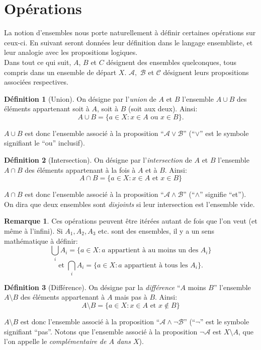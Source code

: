 \documentclass[oneside,12pt,french,table]{book}
\theoremstyle{definition}
\theoremstyle{definition}
\theoremstyle{definition}
\newtheorem{definition}{Définition}[chapter]
\newtheorem*{remark}{Remarque}
\begin{document}
\section{Opérations}
\noindent La notion d'ensembles nous porte naturellement à définir certaines opérations sur ceux-ci. En suivant seront données leur définition dans le langage ensembliste, et leur analogie avec les propositions logiques. \\
Dans tout ce qui suit, $A$, $B$ et $C$ désignent des ensembles quelconques, tous compris dans un ensemble de départ $X$. $\mathcal{A},$ $\mathcal{B}$ et $\mathcal{C}$ désignent leurs propositions associées respectives.
\newpage
\begin{definition}[Union]
On désigne par l'\textit{union} de $A$ et $B$ l'ensemble $A \cup B$ des éléments appartenant soit à $A$, soit à $B$ (soit aux deux). Ainsi:
$$A \cup B = \{ a \in X : x \in A \text{ ou } x \in B \}.$$
\end{definition}
\noindent $A \cup B$ est donc l'ensemble associé à la proposition ``$\mathcal{A} \vee \mathcal{B}$'' (``$\vee$'' est le symbole signifiant le ``ou'' inclusif).
\begin{definition}[Intersection]
On désigne par l'\textit{intersection} de $A$ et $B$ l'ensemble $A \cap B$ des éléments appartenant à la fois à $A$ et à $B$. Ainsi:
$$A \cap B = \{ a \in X : x \in A \text{ et } x \in B \}$$
\end{definition}
\noindent $A \cap B$ est donc l'ensemble associé à la proposition ``$\mathcal{A} \wedge \mathcal{B}$'' (``$\wedge$'' signifie ``et''). \\
On dira que deux ensembles sont \textit{disjoints} si leur intersection est l'ensemble vide.
\begin{remark}
Ces opérations peuvent être itérées autant de fois que l'on veut (et même à l'infini). Si $A_1, A_2, A_3$ etc. sont des ensembles, il y a un sens mathématique à définir: $$\bigcup_i A_i = \{ a \in X : a \text{ appartient à au moins un des } A_i \}$$ $$\text{et } \bigcap_i A_i = \{ a \in X : a \text{ appartient à tous les } A_i \}.$$
\end{remark}
\begin{definition}[Différence]
On désigne par la \textit{différence} ``$A$ moins $B$'' l'ensemble $A \setminus B$ des éléments appartenant à $A$ mais pas à $B$. Ainsi:
$$A \setminus B = \{ a \in X : x \in A \text{ et } x \notin B \}$$
\end{definition}
\noindent $A \setminus B$ est donc l'ensemble associé à la proposition ``$\mathcal{A} \wedge \neg \mathcal{B}$'' (``$\neg$'' est le symbole signifiant ``pas''. Notons que l'ensemble associé à la proposition $\neg \mathcal{A}$ est $X \setminus A$, que l'on appelle le \textit{complémentaire de $A$ dans $X$}).
\end{document}

